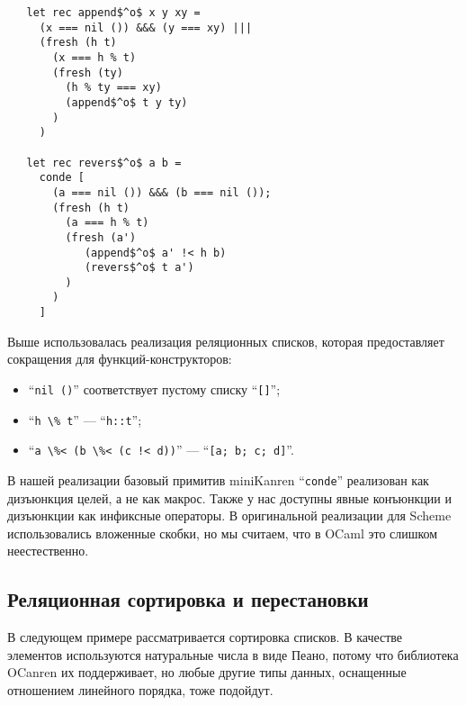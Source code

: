 \begin{lstlisting}
   let rec append$^o$ x y xy =
     (x === nil ()) &&& (y === xy) |||
     (fresh (h t)
       (x === h % t)
       (fresh (ty)
         (h % ty === xy)
         (append$^o$ t y ty)
       )
     )

   let rec revers$^o$ a b =
     conde [
       (a === nil ()) &&& (b === nil ());
       (fresh (h t)
         (a === h % t)
         (fresh (a')
            (append$^o$ a' !< h b)
            (revers$^o$ t a')
         )
       )
     ]
\end{lstlisting}

Выше использовалась реализация реляционных списков, которая предоставляет сокращения для функций-конструкторов:

\begin{itemize}
  \item \enquote{\lstinline=nil ()=} соответствует пустому списку \enquote{\lstinline=[]=};
  \item \enquote{\lstinline[mathescape=false]=h \% t=} --- \enquote{\lstinline[mathescape=false]=h::t=};
  \item \enquote{\lstinline=a \%< (b \%< (c !< d))=} --- \enquote{\lstinline=[a; b; c; d]=}.
\end{itemize}

В нашей реализации базовый примитив miniKanren \enquote{\lstinline|conde|} реализован как дизъюнкция целей, а не как макрос.
Также у нас доступны явные конъюнкции и дизъюнкции как инфиксные операторы.
В оригинальной реализации для Scheme использовались вложенные скобки, но мы считаем, что в OCaml это слишком неестественно.


\subsection{Реляционная сортировка и перестановки}

В следующем примере рассматривается сортировка списков.
В качестве элементов используются натуральные числа в виде Пеано, потому что библиотека OCanren их поддерживает, но любые другие типы данных, оснащенные отношением линейного порядка, тоже подойдут.

